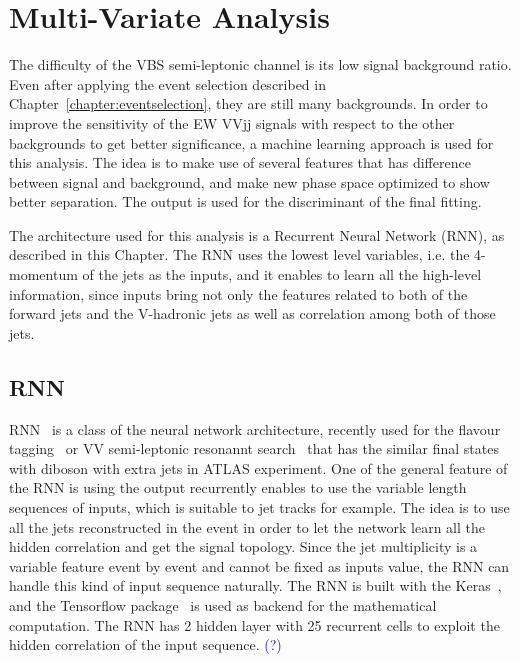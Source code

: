\chapter{Multi-Variate Analysis}
\label{chap:MVA}

The difficulty of the VBS semi-leptonic channel is its low signal background ratio. Even after applying the event selection described in Chapter~\ref{chapter:eventselection}, they are still many backgrounds. In order to improve the sensitivity of the EW VVjj signals with respect to the other backgrounds to get better significance, a machine learning approach is used for this analysis.
The idea is to make use of several features that has difference between signal and background, and make new phase space optimized to show better separation. The output is used for the discriminant of the final fitting.

The architecture used for this analysis is a Recurrent Neural Network (RNN), as described in this Chapter.
The RNN uses the lowest level variables, i.e. the 4-momentum of the jets as the inputs, and it enables to learn all the high-level information, since inputs bring not only the features related to both of the forward jets and the V-hadronic jets as well as correlation among both of those jets.

\section{RNN}
RNN~\cite{Sherstinsky_2020} is a class of the neural network architecture, recently used for the flavour tagging~\cite{ATL-PHYS-PUB-2017-003} or VV semi-leptonic resonannt search~\cite{HDBS-2018-10} that has the similar final states with diboson  with extra jets in ATLAS experiment.
One of the general feature of the RNN is using the output recurrently enables to use the variable length sequences of inputs, which is suitable to jet tracks for example.
The idea is to use all the jets reconstructed in the event in order to let the network learn all the hidden correlation and get the signal topology.
Since the jet multiplicity is a variable feature event by event and cannot be fixed as inputs value, the RNN can handle this kind of input sequence naturally.
The RNN is built with the Keras~\cite{chollet2015keras}, and the Tensorflow package~\cite{tensorflow2015-whitepaper} is used as backend for the mathematical computation. The RNN has 2 hidden layer with 25 recurrent cells to exploit the hidden correlation of the input sequence. \textcolor{blue}{(?)}

